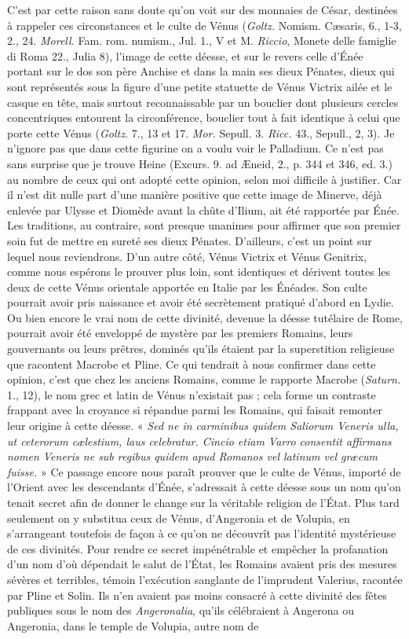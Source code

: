 \documentclass[a4paper, 11pt, oneside, polutonikogreek, french]{article}
\begin{document}
C'est par cette raison sans doute qu'on voit sur des monnaies de César, destinées à rappeler ces circonstances et le culte de Vénus (\emph{Goltz.} Nomism. Cæsaris, 6., 1-3, 2., 24. \emph{Morell.} Fam. rom. numism., Jul. 1., V et M. \emph{Riccio}, Monete delle famiglie di Roma 22., Julia 8), l'image de cette déesse, et sur le revers celle d'Énée portant sur le dos son père Anchise et dans la main ses dieux Pénates, dieux qui sont représentés sous la figure d'une petite statuette de Vénus Victrix ailée et le casque en tête, mais surtout reconnaissable par un bouclier dont plusieurs cercles concentriques entourent la circonférence, bouclier tout à fait identique à celui que porte cette Vénus (\emph{Goltz.} 7., 13 et 17. \emph{Mor.} Sepull. 3. \emph{Ricc.} 43., Sepull., 2, 3). Je n'ignore pas que dans cette figurine on a voulu voir le Palladium. Ce n'est pas sans surprise que je trouve Heine (Excurs. 9. ad Æneid, 2., p. 344 et 346, ed. 3.) au nombre de ceux qui ont adopté cette opinion, selon moi difficile à justifier. Car il n'est dit nulle part d'une manière positive que cette image de Minerve, déjà enlevée par Ulysse et Diomède avant la chûte d'Ilium, ait été rapportée par Énée. Les traditions, au contraire, sont presque unanimes pour affirmer que son premier soin fut de mettre en sureté ses dieux Pénates. D'ailleurs, c'est un point sur lequel nous reviendrons. D'un autre côté, Vénus Victrix et Vénus Genitrix, comme nous espérons le prouver plus loin, sont identiques et dérivent toutes les deux de cette Vénus orientale apportée en Italie par les Énéades. Son culte pourrait avoir pris naissance et avoir été secrètement pratiqué d'abord en Lydie. Ou bien encore le vrai nom de cette divinité, devenue la déesse tutélaire de Rome, pourrait avoir été enveloppé de mystère par les premiers Romains, leurs gouvernants ou leurs prêtres, dominés qu'ils étaient par la superstition religieuse que racontent Macrobe et Pline. Ce qui tendrait à nous confirmer dans cette opinion, c'est que chez les anciens Romains, comme le rapporte Macrobe (\emph{Saturn.} 1., 12), le nom grec et latin de Vénus n'existait pas ; cela forme un contraste frappant avec la croyance si répandue parmi les Romains, qui faisait remonter leur origine à cette déesse. « \emph{Sed ne in carminibus quidem Saliorum Veneris ulla, ut ceterorum cælestium, laus celebratur. Cincio etiam Varro consentit affirmans nomen Veneris ne sub regibus quidem apud Romanos vel latinum vel græcum fuisse.} » Ce passage encore nous paraît prouver que le culte de Vénus, importé de l'Orient avec les descendants d'Énée, s'adressait à cette déesse sous un nom qu'on tenait secret afin de donner le change sur la véritable religion de l'État. Plus tard seulement on y substitua ceux de Vénus, d'Angeronia et de Volupia, en s'arrangeant toutefois de façon à ce qu'on ne découvrît pas l'identité mystérieuse de ces divinités. Pour rendre ce secret impénétrable et empêcher la profanation d'un nom d'où dépendait le salut de l'État, les Romains avaient pris des mesures sévères et terribles, témoin l'exécution sanglante de l'imprudent Valerius, racontée par Pline et Solin. Ils n'en avaient pas moins consacré à cette divinité des fêtes publiques sous le nom des \emph{Angeronalia}, qu'ils célébraient à Angerona ou Angeronia, dans le temple de Volupia, autre nom de 
\end{document}
